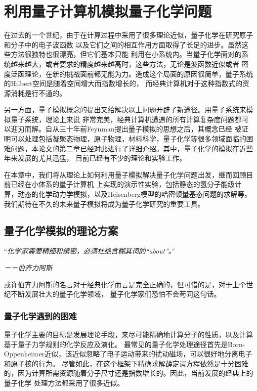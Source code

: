﻿
\chapter{利用量子计算机模拟量子化学问题}

在过去的一个世纪，由于在计算过程中采用了很多理论近似，量子化学在研究原子和分子中的电子波函数
以及它们之间的相互作用方面取得了长足的进步\cite{qschem1}。虽然这些方法很独特也很漂亮，但它们基本只能
利用在小系统内。当量子化学面对的系统越来越大，或者要求的精度越来越高时，这些方法，无论是波函数近似或者
密度泛函理论，在新的挑战面前都无能为力。造成这个局面的原因很简单，量子系统的Hilbert空间是随着空间增大而指数增长的，
而经典计算机对于这种指数式的资源消耗是行不通的。

另一方面，量子模拟概念的提出\cite{Feynman}又给解决以上问题开辟了新途径。用量子系统来模拟量子系统，理论上来说
非常完美，经典计算机遭遇的所有计算复杂度问题都可以迎刃而解。自从三十年前Feynman提出量子模拟的思想之后\cite{Feynman}，其概念已经
被证明可以处理包括凝聚态物理，原子物理，材料科学，量子化学等很多领域面临的困难问题，本论文的第二章已经对此进行了详细介绍。其中，量子化学的模拟在近些年来发展的尤其迅猛，
目前已经有不少的理论和实验工作\cite{chem1}。

在本章中，我们将从理论上如何利用量子模拟解决量子化学问题出发，继而回顾目前已经在小体系的量子计算机
上实现的演示性实验，包括静态的氢分子能级计算，动态的化学动力学模拟，以及Heisenberg模型的哈密顿量基态问题的求解等。
我们期待在不久的未来量子模拟将成为量子化学研究的重要工具。

\section{量子化学模拟的理论方案}

“\emph{化学家需要精细和缜密，必须杜绝含糊其词的“about”。}”

 \hspace{23em} \emph{－－伯齐力阿斯}

或许伯齐力阿斯的名言对于经典化学而言是完全正确的，但可惜的是，对于上个世纪不断发展壮大的量子化学领域，
量子化学家们恐怕不会苟同这句话。

\subsection{量子化学遇到的困难}

量子化学主要的目标是发展理论手段，来尽可能精确地计算分子的性质，以及计算基于量子力学规则的化学反应及演化。
最常见的量子化学处理途径首先是Born-Oppenheimer近似，该近似忽略了电子运动带来的扰动磁场，可以很好地分离电子和原子核的行为。
尽管如此，在这个框架下精确求解薛定谔方程依然是十分困难的，因为计算所需资源随着分子尺寸还是指数增长的。因此，当前发展的经典上的量子化学
处理方法都采用了很多近似。

